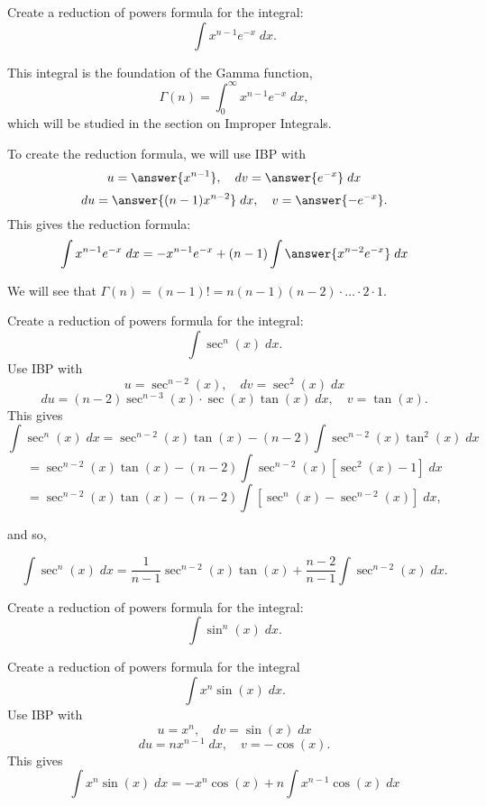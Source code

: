 \documentclass{ximera}
\begin{document}
\begin{problem}
Create a reduction of powers formula for the integral:
\[
\int x^{n-1}e^{-x} \; dx.
\]
\begin{remark}
This integral is the foundation of the Gamma function,
\[
\Gamma(n) = \int_0^\infty x^{n-1}e^{-x} \; dx,
\]
which will be studied in the section on Improper Integrals.
\end{remark}
To create the reduction formula, we will use IBP with
\[
u = \answer{x^{n-1}}, \quad dv = \answer{e^{-x}} \; dx
\]
\[
du = \answer{(n-1)x^{n-2}}\; dx,  \quad v = \answer{-e^{-x}}.
\]
This gives the reduction formula:
\[
\int x^{n-1}e^{-x} \; dx = -x^{n-1}e^{-x} + (n-1)\int \answer{x^{n-2}e^{-x}} \; dx
\]
\begin{remark}
We will see that $\Gamma(n) = (n-1)! = n(n-1)(n-2)\cdot \ldots \cdot 2 \cdot 1$.
\end{remark}

\end{problem}




\begin{example}
Create a reduction of powers formula for the integral:
\[
\int \sec^n(x) \; dx.
\]
Use IBP with
\[
u = \sec^{n-2}(x), \quad dv = \sec^2(x) \; dx
\]
\[
du = (n-2)\sec^{n-3}(x) \cdot \sec(x)\tan(x)\; dx,  \quad v = \tan(x).
\]
This gives
\[
\int \sec^n(x) \; dx = \sec^{n-2}(x)\tan(x) - (n-2)\int \sec^{n-2}(x)\tan^2(x) \; dx
\]
\[
= \sec^{n-2}(x)\tan(x) - (n-2)\int \sec^{n-2}(x)[\sec^2(x) - 1] \; dx
\]
\[
= \sec^{n-2}(x)\tan(x) - (n-2)\int [\sec^n(x)-\sec^{n-2}(x)]\; dx,
\]

and so,

\[
\int \sec^n(x) \; dx = \frac{1}{n-1}\sec^{n-2}(x)\tan(x) + \frac{n-2}{n-1}\int \sec^{n-2}(x) \; dx.
\]

\end{example}



\begin{problem}
Create a reduction of powers formula for the integral:
\[
\int \sin^n(x) \; dx.
\]
\end{problem}



\begin{example}
Create a reduction of powers formula for the integral
\[
\int x^n\sin(x) \; dx.
\]
Use IBP with
\[
u = x^n, \quad dv = \sin(x) \; dx
\]
\[
du = nx^{n-1}\; dx,  \quad v = -\cos(x).
\]
This gives
\[
\int x^n\sin(x) \; dx = -x^n\cos(x) + n\int x^{n-1}\cos(x) \; dx
\]
\end{example}
\end{document}
